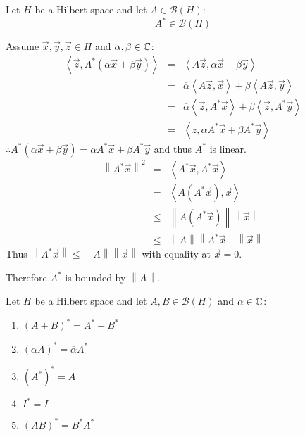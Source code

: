 \documentclass[letterpaper,12pt,fleqn]{article}
\newcommand{\mb}{\mathcal{B}}
\newcommand{\vx}{\vec{x}}
\newcommand{\vy}{\vec{y}}
\newcommand{\vz}{\vec{z}}
\renewcommand{\a}{\alpha}
\renewcommand{\b}{\beta}
\newcommand{\norm}[1]{\left\|#1\right\|}
\newcommand{\inner}[1]{\left<#1\right>}
\newcommand{\conj}[1]{\overline{#1}}
\begin{document}
\begin{theorem}
  Let $H$ be a Hilbert space and let $A\in\mb(H)$:
  \[A^*\in\mb(H)\]
\end{theorem}

\begin{theproof}
  Assume $\vx,\vy,\vz\in H$ and $\a,\b\in\C$:
  \begin{eqnarray*}
    \inner{\vz,A^*(\a\vx+\b\vy)} &=& \inner{A\vz,\a\vx+\b\vy} \\
    &=& \conj{\a}\inner{A\vz,\vx}+\conj{\b}\inner{A\vz,\vy} \\
    &=& \conj{\a}\inner{\vz,A^*\vx}+\conj{\b}\inner{\vz,A^*\vy} \\
    &=& \inner{z,\a A^*\vx+\b A^*\vy}
  \end{eqnarray*}
  $\therefore A^*(\a\vx+\b\vy)=\a A^*\vx+\b A^*\vy$ and thus $A^*$ is linear.
  \begin{eqnarray*}
    \norm{A^*\vx}^2 &=& \inner{A^*\vx,A^*\vx} \\
    &=& \inner{A(A^*\vx),\vx} \\
    &\le& \norm{A(A^*\vx)}\norm{\vx} \\
    &\le& \norm{A}\norm{A^*\vx}\norm{\vx}
  \end{eqnarray*}
  Thus $\norm{A^*\vx}\le\norm{A}\norm{\vx}$ with equality at $\vx=0$.

  Therefore $A^*$ is bounded by $\norm{A}$.
\end{theproof}

\begin{properties}
  Let $H$ be a Hilbert space and let $A,B\in\mb(H)$ and $\a\in\C$:
  \begin{enumerate}
  \item $(A+B)^*=A^*+B^*$
  \item $(\a A)^*=\conj{\a}A^*$
  \item $(A^*)^*=A$
  \item $I^*=I$
  \item $(AB)^*=B^*A^*$
  \end{enumerate}
\end{properties}
\end{document}
